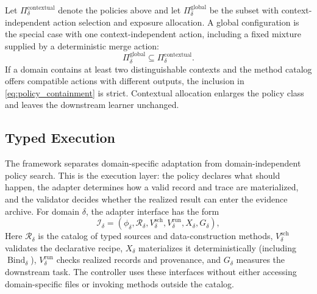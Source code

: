 Let $\Pi_{\delta}^{\mathrm{contextual}}$ denote the policies above and let $\Pi_{\delta}^{\mathrm{global}}$ be the subset with context-independent action selection and exposure allocation.
A global configuration is the special case with one context-independent action, including a fixed mixture supplied by a deterministic merge action:
\begin{equation}
 \Pi_{\delta}^{\mathrm{global}}\subseteq
 \Pi_{\delta}^{\mathrm{contextual}}.
 \label{eq:policy_containment}
\end{equation}
If a domain contains at least two distinguishable contexts and the method catalog offers compatible actions with different outputs, the inclusion in \eqref{eq:policy_containment} is strict.
Contextual allocation enlarges the policy class and leaves the downstream learner unchanged.

\subsection{Typed Execution}

The framework separates domain-specific adaptation from domain-independent policy search. This is the execution layer: the policy declares what should happen, the adapter determines how a valid record and trace are materialized, and the validator decides whether the realized result can enter the evidence archive.
For domain $\delta$, the adapter interface has the form
\begin{equation}
 \mathcal{I}_{\delta}
 =\left(\phi_{\delta},\mathcal{R}_{\delta},
 V_{\delta}^{\mathrm{sch}},V_{\delta}^{\mathrm{run}},
 X_{\delta},G_{\delta}\right),
 \label{eq:domain_adapter}
\end{equation}
Here $\mathcal{R}_{\delta}$ is the catalog of typed sources and data-construction methods, $V_{\delta}^{\mathrm{sch}}$ validates the declarative recipe, $X_{\delta}$ materializes it deterministically (including $\operatorname{Bind}_{\delta}$), $V_{\delta}^{\mathrm{run}}$ checks realized records and provenance, and $G_{\delta}$ measures the downstream task.
The controller uses these interfaces without either accessing domain-specific files or invoking methods outside the catalog.

